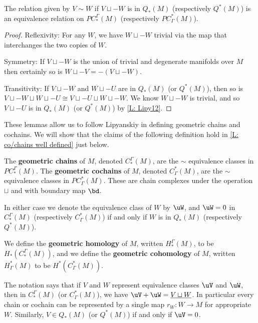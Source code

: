 \begin{lemma}\label{L: cancel Q}
	The relation given by $V\sim W$ if $V \sqcup -W$ is in $Q_*(M)$ (respectively $Q^*(M)$) is an equivalence relation on $PC^\Gamma_*(M)$ (respectively $PC_\Gamma^*(M)$).
\end{lemma}

\begin{proof}
	Reflexivity: For any $W$, we have $W \sqcup -W$ trivial via the map that interchanges the two copies of $W$.

	Symmetry: If $V \sqcup -W$ is the union of trivial and degenerate manifolds over $M$ then certainly so is $W \sqcup -V = -(V \sqcup -W)$.

	Transitivity: If $V \sqcup -W$ and $W \sqcup -U$ are in $Q_*(M)$ (or $Q^*(M)$), then so is $V \sqcup -W \sqcup W \sqcup -U \cong V \sqcup -U \sqcup W \sqcup -W$.
	We know $W \sqcup -W$ is trivial, and so $V \sqcup -U$ is in $Q_*(M)$ (or $Q^*(M)$) by \cref{L: Lipy12}.
\end{proof}

These lemmas allow us to follow Lipyanskiy in defining geometric chains and cochains.
We will show that the claims of the following definition hold in \cref{L: co/chains well defined} just below.

\begin{definition}
	The \textbf{geometric chains} of $M$, denoted $C^\Gamma_*(M)$, are the $\sim$ equivalence classes in $PC^\Gamma_*(M)$.
	The \textbf{geometric cochains} of $M$, denoted $C_\Gamma^*(M)$, are the $\sim$ equivalence classes in $PC_\Gamma^*(M)$.
	These are chain complexes under the operation $\sqcup$ and with boundary map $\bd$.

	In either case we denote the equivalence class of $W$ by $\uW$, and $\uW = 0$ in $C^\Gamma_*(M)$ (respectively $C_\Gamma^*(M)$) if and only if $W$ is in $Q_*(M)$ (respectively $Q^*(M)$).

	We define the \textbf{geometric homology} of $M$, written $H_*^\Gamma(M)$, to be $H_*(C^\Gamma_*(M))$, and
	we define the \textbf{geometric cohomology} of $M$, written $H^*_\Gamma(M)$ to be $H^*(C_\Gamma^*(M))$.
\end{definition}

The notation says that if $V$ and $W$ represent equivalence classes $\uV$ and $\uW$, then in $C_*^{\Gamma}(M)$ (or $C^*_\Gamma(M)$), we have $\uV+\uW = \underline{V \sqcup W}$.
In particular every chain or cochain can be represented by a single map $r_W \colon W \to M$ for appropriate $W$.
Similarly, $V \in Q_*(M)$ (or $Q^*(M)$) if and only if $\uV = 0$.

